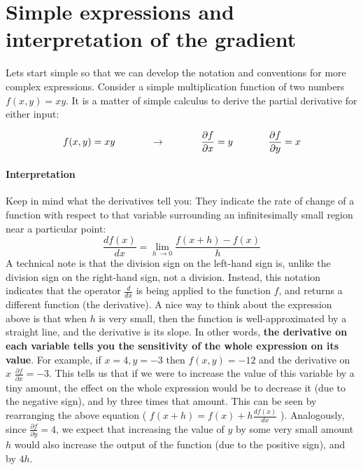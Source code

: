 \section*{Simple expressions and interpretation of the gradient}

Lets start simple so that we can develop the notation and conventions for more complex expressions. Consider a simple multiplication function of two numbers $f(x,y)=xy$. It is a matter of simple calculus to derive the partial derivative for either input:

\begin{equation}
f(x,y) = x y \hspace{0.5in} \rightarrow \hspace{0.5in} \frac{\partial f}{\partial x} = y \hspace{0.5in} \frac{\partial f}{\partial y} = x
\end{equation}

\paragraph*{Interpretation} Keep in mind what the derivatives tell you: They indicate the rate of change of a function with respect to that variable surrounding an infinitesimally small region near a particular point:
\begin{equation}
\frac{df(x)}{dx} = \lim_{h\ \to 0} \frac{f(x + h) - f(x)}{h}
\end{equation}
A technical note is that the division sign on the left-hand sign is, unlike the division sign on the right-hand sign, not a division. Instead, this notation indicates that the operator $\frac{d}{dx}$ is being applied to the function $f$, and returns a different function (the derivative). A nice way to think about the expression above is that when $h$ is very small, then the function is well-approximated by a straight line, and the derivative is its slope. In other words, \textbf{the derivative on each variable tells you the sensitivity of the whole expression on its value}. For example, if $x=4,y=-3$ then $f(x,y)=-12$ and the derivative on $x$ $\frac{\partial f}{\partial x} = -3$. This tells us that if we were to increase the value of this variable by a tiny amount, the effect on the whole expression would be to decrease it (due to the negative sign), and by three times that amount. This can be seen by rearranging the above equation ( $f(x + h) = f(x) + h \frac{df(x)}{dx}$ ). Analogously, since $\frac{\partial f}{\partial y} = 4$, we expect that increasing the value of $y$ by some very small amount $h$ would also increase the output of the function (due to the positive sign), and by $4h$.

